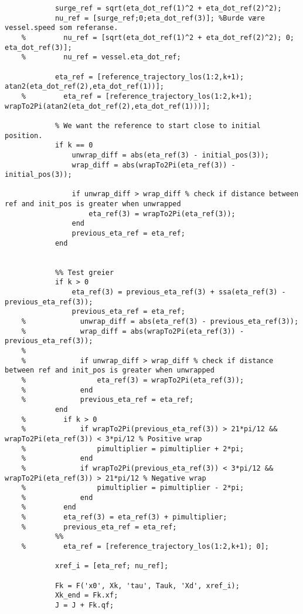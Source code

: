 \begin{lstlisting}
            surge_ref = sqrt(eta_dot_ref(1)^2 + eta_dot_ref(2)^2);
            nu_ref = [surge_ref;0;eta_dot_ref(3)]; %Burde være vessel.speed som referanse.
    %         nu_ref = [sqrt(eta_dot_ref(1)^2 + eta_dot_ref(2)^2); 0; eta_dot_ref(3)];
    %         nu_ref = vessel.eta_dot_ref;
            
            eta_ref = [reference_trajectory_los(1:2,k+1); atan2(eta_dot_ref(2),eta_dot_ref(1))]; 
    %         eta_ref = [reference_trajectory_los(1:2,k+1); wrapTo2Pi(atan2(eta_dot_ref(2),eta_dot_ref(1)))];
    
            % We want the reference to start close to initial position.
            if k == 0
                unwrap_diff = abs(eta_ref(3) - initial_pos(3));
                wrap_diff = abs(wrapTo2Pi(eta_ref(3)) - initial_pos(3));
    
                if unwrap_diff > wrap_diff % check if distance between ref and init_pos is greater when unwrapped
                    eta_ref(3) = wrapTo2Pi(eta_ref(3));
                end
                previous_eta_ref = eta_ref;
            end
    
            
            %% Test greier
            if k > 0
                eta_ref(3) = previous_eta_ref(3) + ssa(eta_ref(3) - previous_eta_ref(3));
                previous_eta_ref = eta_ref; 
    %             unwrap_diff = abs(eta_ref(3) - previous_eta_ref(3));
    %             wrap_diff = abs(wrapTo2Pi(eta_ref(3)) - previous_eta_ref(3));
    % 
    %             if unwrap_diff > wrap_diff % check if distance between ref and init_pos is greater when unwrapped
    %                 eta_ref(3) = wrapTo2Pi(eta_ref(3));
    %             end
    %             previous_eta_ref = eta_ref;
            end            
    %         if k > 0
    %             if wrapTo2Pi(previous_eta_ref(3)) > 21*pi/12 && wrapTo2Pi(eta_ref(3)) < 3*pi/12 % Positive wrap
    %                 pimultiplier = pimultiplier + 2*pi;
    %             end
    %             if wrapTo2Pi(previous_eta_ref(3)) < 3*pi/12 && wrapTo2Pi(eta_ref(3)) > 21*pi/12 % Negative wrap
    %                 pimultiplier = pimultiplier - 2*pi;
    %             end
    %         end
    %         eta_ref(3) = eta_ref(3) + pimultiplier;
    %         previous_eta_ref = eta_ref;
            %%
    %         eta_ref = [reference_trajectory_los(1:2,k+1); 0];
            
            xref_i = [eta_ref; nu_ref];
            
            Fk = F('x0', Xk, 'tau', Tauk, 'Xd', xref_i);
            Xk_end = Fk.xf;
            J = J + Fk.qf;
            

\end{lstlisting}
